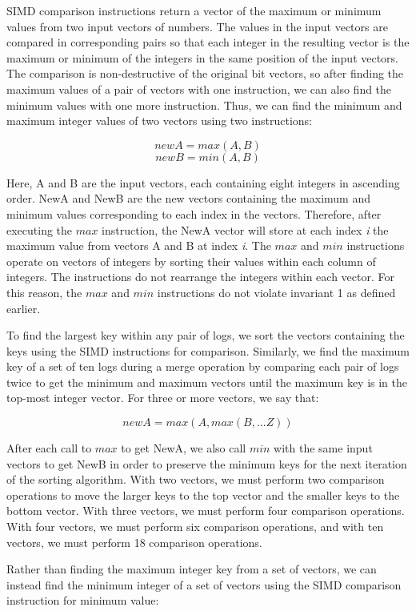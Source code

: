 \documentclass[10pt,twocolumn]{article}
\begin{document}
SIMD comparison instructions return a vector of the maximum or minimum values from two input vectors of numbers.  The values in the input vectors are compared in corresponding pairs so that each integer in the resulting vector is the maximum or minimum of the integers in the same position of the input vectors.  The comparison is non-destructive of the original bit vectors, so after finding the maximum values of a pair of vectors with one instruction, we can also find the minimum values with one more instruction.  Thus, we can find the minimum and maximum integer values of two vectors using two instructions:

$$newA = max(A, B)$$
$$newB = min(A, B)$$

Here, A and B are the input vectors, each containing eight integers in ascending order.  NewA and NewB are the new vectors containing the maximum and minimum values corresponding to each index in the vectors.  Therefore, after executing the $max$ instruction, the NewA vector will store at each index \textit{i} the maximum value from vectors A and B at index \textit{i}.  The $max$ and $min$ instructions operate on vectors of integers by sorting their values within each column of integers.  The instructions do not rearrange the integers within each vector.  For this reason, the $max$ and $min$ instructions do not violate invariant 1 as defined earlier.

To find the largest key within any pair of logs, we sort the vectors containing the keys using the SIMD instructions for comparison.  Similarly, we find the maximum key of a set of ten logs during a merge operation by comparing each pair of logs twice to get the minimum and maximum vectors until the maximum key is in the top-most integer vector.  For three or more vectors, we say that:

$$newA = max(A, max(B, ... Z))$$

After each call to $max$ to get NewA, we also call $min$ with the same input vectors to get NewB in order to preserve the minimum keys for the next iteration of the sorting algorithm.  With two vectors, we must perform two comparison operations to move the larger keys to the top vector and the smaller keys to the bottom vector.  With three vectors, we must perform four comparison operations.  With four vectors, we must perform six comparison operations, and with ten vectors, we must perform 18 comparison operations.

Rather than finding the maximum integer key from a set of vectors, we can instead find the minimum integer of a set of vectors using the SIMD comparison instruction for minimum value:
\end{document}
